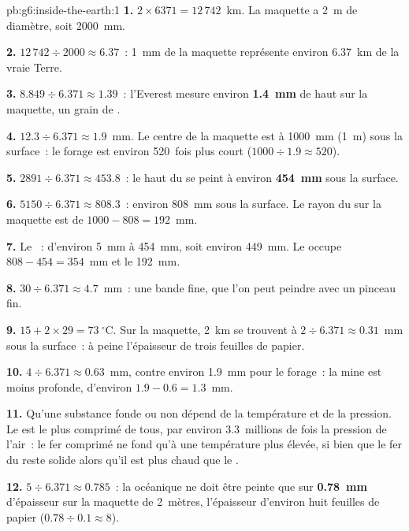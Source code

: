 \begin{solution}{pb:g6:inside-the-earth:1}
\textbf{1.} $2 \times 6371 = 12\,742$~km. La maquette a 2~m de diamètre,
soit 2000~mm.

\textbf{2.} $12\,742 \div 2000 \approx 6.37$~: 1~mm de la maquette
représente environ 6.37~km de la vraie Terre.

\textbf{3.} $8.849 \div 6.371 \approx 1.39$~: l'Everest mesure environ
\textbf{1.4~mm} de haut sur la maquette, un grain de .

\textbf{4.} $12.3 \div 6.371 \approx 1.9$~mm. Le centre de la maquette est
à 1000~mm (1~m) sous la surface~: le forage est environ 520~fois plus
court ($1000 \div 1.9 \approx 520$).

\textbf{5.} $2891 \div 6.371 \approx 453.8$~: le haut du  se
peint à environ \textbf{454~mm} sous la surface.

\textbf{6.} $5150 \div 6.371 \approx 808.3$~: environ 808~mm sous la
surface. Le rayon du  sur la maquette est de
$1000 - 808 = 192$~mm.

\textbf{7.} Le ~: d'environ 5~mm à 454~mm, soit environ 449~mm. Le
 occupe $808 - 454 = 354$~mm et le  192~mm.

\textbf{8.} $30 \div 6.371 \approx 4.7$~mm~: une bande fine, que l'on peut
peindre avec un pinceau fin.

\textbf{9.} $15 + 2 \times 29 = 73~^\circ$C. Sur la maquette, 2~km se
trouvent à $2 \div 6.371 \approx 0.31$~mm sous la surface~: à peine
l'épaisseur de trois feuilles de papier.

\textbf{10.} $4 \div 6.371 \approx 0.63$~mm, contre environ 1.9~mm pour le
forage~: la mine est moins profonde, d'environ $1.9 - 0.6 = 1.3$~mm.

\textbf{11.} Qu'une substance fonde ou non dépend de la température et de
la pression. Le  est le plus comprimé de tous, par environ
3.3~millions de fois la pression de l'air~: le fer comprimé ne fond qu'à
une température plus élevée, si bien que le fer du  reste
solide alors qu'il est plus chaud que le .

\textbf{12.} $5 \div 6.371 \approx 0.785$~: la  océanique ne doit
être peinte que sur \textbf{0.78~mm} d'épaisseur sur la maquette de
2~mètres, l'épaisseur d'environ huit feuilles de papier
($0.78 \div 0.1 \approx 8$).
\end{solution}
